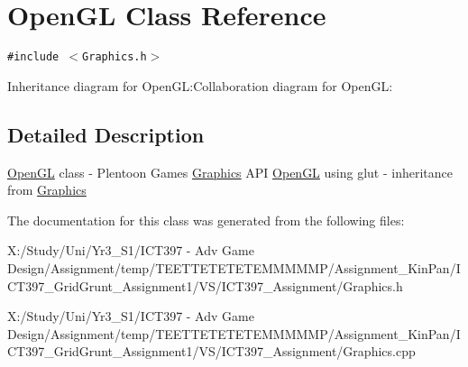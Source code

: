 \hypertarget{class_open_g_l}{
\section{OpenGL Class Reference}
\label{class_open_g_l}
}
{\tt \#include $<$Graphics.h$>$}

Inheritance diagram for OpenGL:Collaboration diagram for OpenGL:

\subsection{Detailed Description}
\hyperlink{class_open_g_l}{OpenGL} class - Plentoon Games \hyperlink{class_graphics}{Graphics} API \hyperlink{class_open_g_l}{OpenGL} using glut - inheritance from \hyperlink{class_graphics}{Graphics} 

The documentation for this class was generated from the following files:\begin{CompactItemize}
\item 
X:/Study/Uni/Yr3\_\-S1/ICT397 - Adv Game Design/Assignment/temp/TEETTETETETEMMMMMP/Assignment\_\-KinPan/ICT397\_\-GridGrunt\_\-Assignment1/VS/ICT397\_\-Assignment/Graphics.h\item 
X:/Study/Uni/Yr3\_\-S1/ICT397 - Adv Game Design/Assignment/temp/TEETTETETETEMMMMMP/Assignment\_\-KinPan/ICT397\_\-GridGrunt\_\-Assignment1/VS/ICT397\_\-Assignment/Graphics.cpp\end{CompactItemize}
